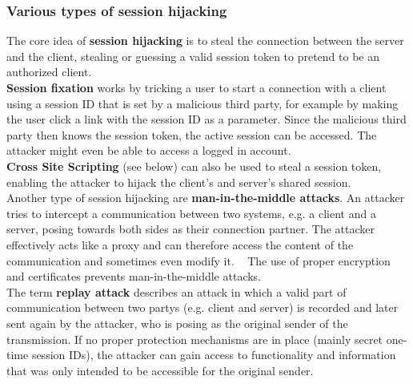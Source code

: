 \documentclass[
	a4paper,
	pagesize,
	pdftex,
	12pt,
	twoside, %
	BCOR=5mm, %
	ngerman,
	fleqn,
	final,
	]{scrartcl}
\begin{document}
\subsubsection{Various types of session hijacking}
The core idea of \textbf{session hijacking} is to steal the connection between the server and the client, stealing or guessing a valid session token to pretend to be an authorized client.~\cite{OWASPFoundation.14.8.2014}\\
\textbf{Session fixation} works by tricking a user to start a connection with a client using a session ID that is set by a malicious third party, for example by making the user click a link with the session ID as a parameter. Since the malicious third party then knows the session token, the active session can be accessed. The attacker might even be able to access a logged in account.
~\cite{OWASPFoundation.14.8.2014}\\
\textbf{Cross Site Scripting} (see below) can also be used to steal a session token, enabling the attacker to hijack the client's and server's shared session.\\
Another type of session hijacking are \textbf{man-in-the-middle attacks}. An attacker tries to intercept a communication between two systems, e.g. a client and a server, posing towards both sides as their connection partner. The attacker effectively acts like a proxy and can therefore access the content of the communication and sometimes even modify it. ~\cite{OWASPFoundation.31.8.2015} The use of proper encryption and certificates prevents man-in-the-middle attacks.\\
The term \textbf{replay attack} describes an attack in which a valid part of communication between two partys (e.g. client and server) is recorded and later sent again by the attacker, who is posing as the original sender of the transmission. If no proper protection mechanisms are in place (mainly secret one-time session IDs), the attacker can gain access to functionality and information that was only intended to be accessible for the original sender.
\end{document}
